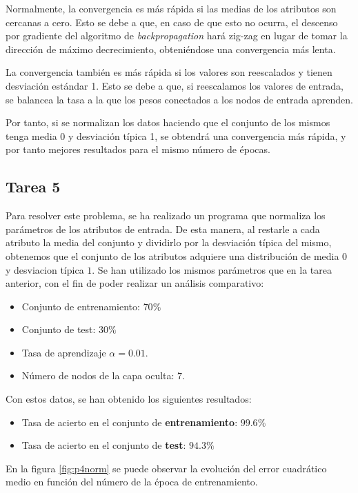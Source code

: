 \documentclass[spanish]{assignment}
\begin{document}
	Normalmente, la convergencia es más rápida si las medias de los atributos son cercanas a cero. Esto se debe a que, en caso de que esto no ocurra, el descenso por gradiente del algoritmo de \textit{backpropagation} hará zig-zag en lugar de tomar la dirección de máximo decrecimiento, obteniéndose una convergencia más lenta. 
	
	La convergencia también es más rápida si los valores son reescalados y tienen desviación estándar 1. Esto se debe a que, si reescalamos los valores de entrada, se balancea la tasa a la que los pesos conectados a los nodos de entrada aprenden.
	
	Por tanto, si se normalizan los datos haciendo que el conjunto de los mismos tenga media 0 y desviación típica 1, se obtendrá una convergencia más rápida, y por tanto mejores resultados para el mismo número de épocas.
	
	\subsection{Tarea 5}
	Para resolver este problema, se ha realizado un programa que normaliza los parámetros de los atributos de entrada. De esta manera, al restarle a cada atributo la media del conjunto y dividirlo por la desviación típica del mismo, obtenemos que el conjunto de los atributos adquiere una distribución de media $0$ y desviacion típica $1$. Se han utilizado los mismos parámetros que en la tarea anterior, con el fin de poder realizar un análisis comparativo:
	\begin{itemize}
		\item Conjunto de entrenamiento: $70\%$
		\item Conjunto de test: $30\%$
		\item Tasa de aprendizaje $\alpha = 0.01$.		
		\item Número de nodos de la capa oculta: $7$.
	\end{itemize}
	
	Con estos datos, se han obtenido los siguientes resultados:
	\begin{itemize}
		\item Tasa de acierto en el conjunto de \textbf{entrenamiento}: $99.6\%$
		\item Tasa de acierto en el conjunto de \textbf{test}: $94.3\%$
	\end{itemize}
	
	
	En la figura \ref{fig:p4norm} se puede observar la evolución del error cuadrático medio en función del número de la época de entrenamiento. 
	
\end{document}
